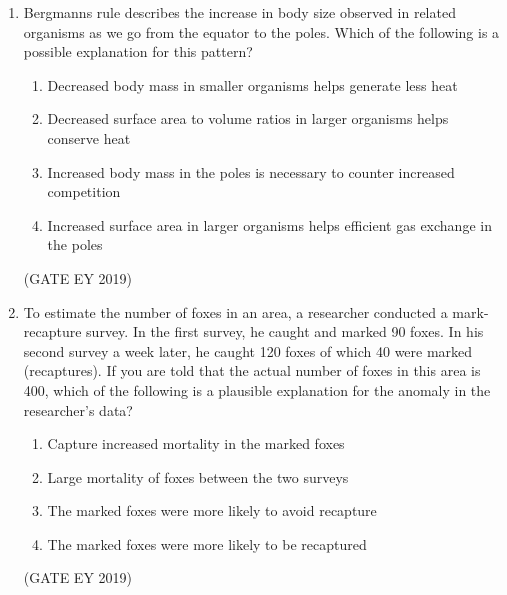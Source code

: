\documentclass[journal,12pt,onecolumn]{IEEEtran}
\theoremstyle{remark}
\begin{document}
\begin{enumerate}[resume]
\begin{multicols}{4}
\begin{enumerate}
\item i
\item ii
\item iii
\item iv
\end{enumerate}
\end{multicols}

\hfill{(GATE EY 2019)}


\item Bergmanns rule describes the increase in body size observed in related organisms as we go from the equator to the poles. Which of the following is a possible explanation for this pattern?


\begin{enumerate}
\item Decreased body mass in smaller organisms helps generate less heat
\item Decreased surface area to volume ratios in larger organisms helps conserve heat
\item Increased body mass in the poles is necessary to counter increased competition
\item Increased surface area in larger organisms helps efficient gas exchange in the poles
\end{enumerate}


\hfill{(GATE EY 2019)}
\item To estimate the number of foxes in an area, a researcher conducted a mark-recapture survey. In the first survey, he caught and marked 90 foxes. In his second survey a week later, he caught 120 foxes of which 40 were marked (recaptures). If you are told that the actual number of foxes in this area is 400, which of the following is a plausible explanation for the anomaly in the researcher's data?

\begin{enumerate}
\item Capture increased mortality in the marked foxes
\item Large mortality of foxes between the two surveys
\item The marked foxes were more likely to avoid recapture
\item The marked foxes were more likely to be recaptured
\end{enumerate}
\hfill{(GATE EY 2019)}


\end{enumerate}
\end{document}

